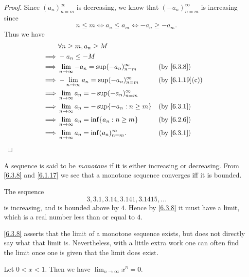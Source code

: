 \begin{proof}
  Since \((a_n)_{n = m}^\infty\) is decreasing, we know that \((-a_n)_{n = m}^\infty\) is increasing since
  \[
    n \leq m \iff a_n \leq a_m \iff -a_n \geq -a_m.
  \]
  Thus we have
  \begin{align*}
             & \forall n \geq m, a_n \geq M                                             \\
    \implies & -a_n \leq -M                                                             \\
    \implies & \lim_{n \to \infty} -a_n = \sup(-a_n)_{n = m}^\infty &  & \by{6.3.8}     \\
    \implies & -\lim_{n \to \infty} a_n = \sup(-a_n)_{n = m}^\infty &  & \by{6.1.19}[c] \\
    \implies & \lim_{n \to \infty} a_n = -\sup(-a_n)_{n = m}^\infty                     \\
    \implies & \lim_{n \to \infty} a_n = -\sup\set{-a_n : n \geq m} &  & \by{6.3.1}     \\
    \implies & \lim_{n \to \infty} a_n = \inf\set{a_n : n \geq m}   &  & \by{6.2.6}     \\
    \implies & \lim_{n \to \infty} a_n = \inf(a_n)_{n = m}^\infty.  &  & \by{6.3.1}
  \end{align*}
\end{proof}

\begin{note}
  A sequence is said to be \emph{monotone} if it is either increasing or decreasing.
  From \cref{6.3.8} and \cref{6.1.17} we see that a monotone sequence converges iff it is bounded.
\end{note}

\begin{eg}\label{6.3.9}
  The sequence
  \[
    3, 3.1, 3.14, 3.141, 3.1415, \dots
  \]
  is increasing, and is bounded above by \(4\).
  Hence by \cref{6.3.8} it must have a limit, which is a real number less than or equal to \(4\).
\end{eg}

\begin{note}
  \cref{6.3.8} asserts that the limit of a monotone sequence exists, but does not directly say what that limit is.
  Nevertheless, with a little extra work one can often find the limit once one is given that the limit does exist.
\end{note}

\begin{prop}\label{6.3.10}
  Let \(0 < x < 1\).
  Then we have \(\lim_{n \to \infty} x^n = 0\).
\end{prop}


